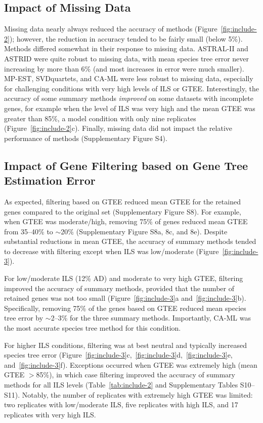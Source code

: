 \subsection{Impact of Missing Data}
Missing data nearly always reduced the accuracy  of methods (Figure~\ref{fig:include-2}); however, the reduction in accuracy tended to be fairly small (below 5\%). 
Methods differed somewhat in their response to missing data. ASTRAL-II and ASTRID were quite robust to missing data, with mean species tree error never increasing by more than 6\% (and most increases in error were much smaller). 
MP-EST, SVDquartets, and CA-ML were less robust to missing data, especially for challenging conditions with very high levels of ILS or GTEE.
Interestingly, the accuracy of some summary methods {\em improved} on some datasets with incomplete genes, for example when the level of ILS was very high and the mean GTEE was greater than 85\%, a model condition with only nine replicates (Figure~\ref{fig:include-2}c).
Finally, missing data did not impact the relative performance of methods (Supplementary Figure S4).

\subsection{Impact of Gene Filtering based on Gene Tree Estimation Error}
As expected, filtering based on GTEE reduced mean GTEE for the retained genes compared to the original set (Supplementary Figure S8).
For example, when GTEE was moderate/high, removing 75\% of genes reduced mean GTEE from 35--40\% to $\sim$20\% (Supplementary Figure S8a, 8c, and 8e). 
Despite substantial reductions in mean GTEE, the accuracy of summary methods tended to decrease with filtering except when ILS was low/moderate (Figure~\ref{fig:include-3}).

For low/moderate ILS (12\% AD) and moderate to very high GTEE, filtering improved the accuracy of summary methods, provided that the number of retained genes was not too small (Figure~\ref{fig:include-3}a and~\ref{fig:include-3}b).
Specifically, removing 75\% of the genes based on GTEE reduced mean species tree error by $\sim$2--3\% for the three summary methods.
Importantly, CA-ML was the most accurate species tree method for this condition.

For higher ILS conditions, filtering was at best neutral and typically increased species tree error (Figure~\ref{fig:include-3}c,~\ref{fig:include-3}d,~\ref{fig:include-3}e, and~\ref{fig:include-3}f).
Exceptions occurred when GTEE was extremely high (mean GTEE $>$85\%), in which case filtering improved the accuracy of summary methods for all ILS levels (Table~\ref{tab:include-2} and Supplementary Tables S10--S11).
Notably, the number of replicates with extremely high GTEE was limited: two replicates with low/moderate ILS, five
replicates with high ILS, and 17 replicates with very high ILS.

